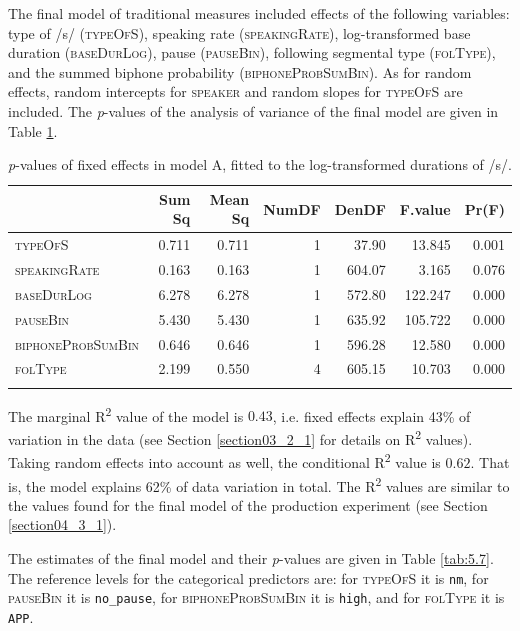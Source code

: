 The final model of traditional measures included effects of the following variables: type of /s/ (\textsc{typeOfS}), speaking rate (\textsc{speakingRate}), log-transformed base duration (\textsc{baseDurLog}), pause (\textsc{pauseBin}), following segmental type (\textsc{folType}), and the summed biphone probability (\textsc{biphoneProbSumBin}). As for random effects, random intercepts for \textsc{speaker} and random slopes for \textsc{typeOfS} are included. The \textit{p}-values of the analysis of variance of the final model are given in Table \ref{tab:5.6}.

\begin{table}\fontsize{10}{11}
\caption{\textit{p}-values of fixed effects in model A, fitted to the log-transformed durations of /s/.}
\label{tab:5.6}
\centering
\begin{tabular}{lrrrrrr} 
\lsptoprule
~                 & Sum Sq & Mean Sq & NumDF & DenDF  & F.value & Pr(F)  \\ 
\midrule
\textsc{typeOfS}           & 0.711  & 0.711   & 1     & 37.90  & 13.845  & 0.001  \\
\textsc{speakingRate}      & 0.163  & 0.163   & 1     & 604.07 & 3.165   & 0.076  \\
\textsc{baseDurLog}        & 6.278  & 6.278   & 1     & 572.80 & 122.247 & 0.000  \\
\textsc{pauseBin}          & 5.430  & 5.430   & 1     & 635.92 & 105.722 & 0.000  \\
\textsc{biphoneProbSumBin} & 0.646  & 0.646   & 1     & 596.28 & 12.580  & 0.000  \\
\textsc{folType}           & 2.199  & 0.550   & 4     & 605.15 & 10.703  & 0.000  \\
\lspbottomrule
\end{tabular}
\end{table}

The marginal R\textsuperscript{2} value of the model is $0.43$, i.e. fixed effects explain 43\% of variation in the data (see Section \ref{section03_2_1} for details on R\textsuperscript{2} values). Taking random effects into account as well, the conditional R\textsuperscript{2} value is $0.62$. That is, the model explains 62\% of data variation in total. The R\textsuperscript{2} values are similar to the values found for the final model of the production experiment (see Section \ref{section04_3_1}).

The estimates of the final model and their \textit{p}-values are given in Table \ref{tab:5.7}. The reference levels for the categorical predictors are: for \textsc{typeOfS} it is \texttt{nm}, for \textsc{pauseBin} it is \texttt{no\_pause}, for \textsc{biphoneProbSumBin} it is \texttt{high}, and for \textsc{folType} it is \texttt{APP}.

